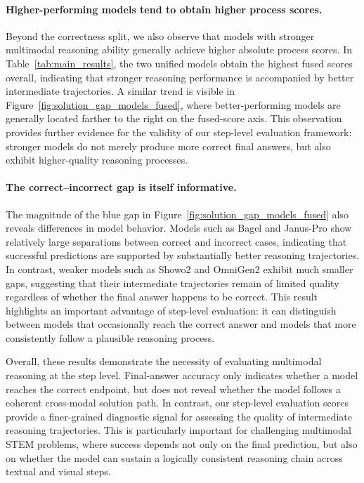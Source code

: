 \documentclass[11pt]{article}
\begin{document}
\paragraph{Higher-performing models tend to obtain higher process scores.}
Beyond the correctness split, we also observe that models with stronger multimodal reasoning ability generally achieve higher absolute process scores. In Table~\ref{tab:main_results}, the two unified models obtain the highest fused scores overall, indicating that stronger reasoning performance is accompanied by better intermediate trajectories. A similar trend is visible in Figure~\ref{fig:solution_gap_models_fused}, where better-performing models are generally located farther to the right on the fused-score axis. This observation provides further evidence for the validity of our step-level evaluation framework: stronger models do not merely produce more correct final answers, but also exhibit higher-quality reasoning processes.

\paragraph{The correct--incorrect gap is itself informative.}
The magnitude of the blue gap in Figure~\ref{fig:solution_gap_models_fused} also reveals differences in model behavior. Models such as Bagel and Janus-Pro show relatively large separations between correct and incorrect cases, indicating that successful predictions are supported by substantially better reasoning trajectories. In contrast, weaker models such as Showo2 and OmniGen2 exhibit much smaller gaps, suggesting that their intermediate trajectories remain of limited quality regardless of whether the final answer happens to be correct. This result highlights an important advantage of step-level evaluation: it can distinguish between models that occasionally reach the correct answer and models that more consistently follow a plausible reasoning process.

Overall, these results demonstrate the necessity of evaluating multimodal reasoning at the step level. Final-answer accuracy only indicates whether a model reaches the correct endpoint, but does not reveal whether the model follows a coherent cross-modal solution path. In contrast, our step-level evaluation scores provide a finer-grained diagnostic signal for assessing the quality of intermediate reasoning trajectories. This is particularly important for challenging multimodal STEM problems, where success depends not only on the final prediction, but also on whether the model can sustain a logically consistent reasoning chain across textual and visual steps.
\end{document}
